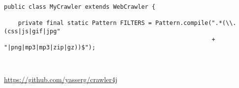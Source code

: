 \begin{verbatim}
public class MyCrawler extends WebCrawler {

    private final static Pattern FILTERS = Pattern.compile(".*(\\.(css|js|gif|jpg"
                                                           + "|png|mp3|mp3|zip|gz))$");
                                                           
                                                           
\end{verbatim}
\url{https://github.com/yasserg/crawler4j}